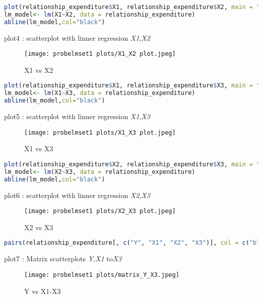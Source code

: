 \documentclass[12pt,letterpaper]{article}
\begin{document}
\begin{itemize}
\newpage
\begin{lstlisting}[language=R]
plot(relationship_expenditure$X1, relationship_expenditure$X2, main = "X1 vs. X2", xlab = "X1", ylab = "X2", col = "blue")
lm_model<- lm(X1~X2, data = relationship_expenditure)
abline(lm_model,col="black")
\end{lstlisting}

plot4 : scatterplot with linner regression \emph{X1},\emph{X2}
\begin{figure}[htp]
    \centering
    \texttt{[image: probelmset1 plots/X1\_X2 plot.jpeg]}
    \caption{X1 vs X2 }
    \label{X1_X2 plot}
\end{figure}
\begin{lstlisting}[language=R]
plot(relationship_expenditure$X1, relationship_expenditure$X3, main = "X1 vs. X3", xlab = "X1", ylab = "X3", col = "green")
lm_model<- lm(X1~X3, data = relationship_expenditure)
abline(lm_model,col="black")
\end{lstlisting}

plot5 : scatterplot with linner regression \emph{X1},\emph{X3}
\begin{figure}[htp]
    \centering
    \texttt{[image: probelmset1 plots/X1\_X3 plot.jpeg]}
    \caption{X1 vs X3 }
    \label{X1_X3 plot}
\end{figure}
\newpage
\begin{lstlisting}[language=R]
plot(relationship_expenditure$X2, relationship_expenditure$X3, main = "X2 vs. X3", xlab = "X2", ylab = "X3", col = "orange")
lm_model<- lm(X2~X3, data = relationship_expenditure)
abline(lm_model,col="black")
\end{lstlisting}

plot6 : scatterplot with linner regression \emph{X2},\emph{X3}
\begin{figure}[htp]
    \centering
    \texttt{[image: probelmset1 plots/X2\_X3 plot.jpeg]}
    \caption{X2 vs X3 }
    \label{X2_X3 plot}
\end{figure}

\begin{lstlisting}[language=R]
pairs(relationship_expenditure[, c("Y", "X1", "X2", "X3")], col = c("blue", "red", "green", "purple"))
\end{lstlisting}
plot7 : Matrix scatterplots  \emph{Y},\emph{X1} to\emph{X3}
\begin{figure}[htp]
    \centering
    \texttt{[image: probelmset1 plots/matrix\_Y\_X3.jpeg]}
    \caption{Y vs X1-X3 }
    \label{Matrix plot}
\end{figure}


\end{itemize}
\end{document}
